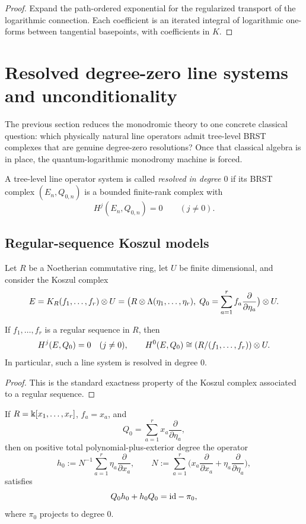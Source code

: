\begin{proof}
Expand the path-ordered exponential for the regularized transport of the logarithmic connection. Each coefficient is an iterated integral of logarithmic one-forms between tangential basepoints, with coefficients in $K$.
\end{proof}

\section{Resolved degree-zero line systems and unconditionality}\label{sec:resolved}

The previous section reduces the monodromic theory to one concrete classical question: which physically natural line operators admit tree-level BRST complexes that are genuine degree-zero resolutions? Once that classical algebra is in place, the quantum-logarithmic monodromy machine is forced.

\begin{definition}\label{def:resolved-line}
A tree-level line operator system is called \emph{resolved in degree $0$} if its BRST complex $(E_n,Q_{0,n})$ is a bounded finite-rank complex with
\[
 H^j(E_n,Q_{0,n})=0 \qquad (j\neq 0).
\]
\end{definition}

\subsection{Regular-sequence Koszul models}
Let $R$ be a Noetherian commutative ring, let $U$ be finite dimensional, and consider the Koszul complex
\[
 E = K_R(f_1,\dots,f_r)\otimes U
 = \big(R\otimes \Lambda(\eta_1,\dots,\eta_r),\;Q_0=\sum_{a=1}^r f_a\frac{\partial}{\partial\eta_a}\big)\otimes U.
\]

\begin{proposition}\label{prop:regular-sequence}
If $f_1,\dots,f_r$ is a regular sequence in $R$, then
\[
 H^j(E,Q_0)=0\quad (j\neq 0),
 \qquad
 H^0(E,Q_0)\cong (R/(f_1,\dots,f_r))\otimes U.
\]
In particular, such a line system is resolved in degree $0$.
\end{proposition}

\begin{proof}
This is the standard exactness property of the Koszul complex associated to a regular sequence.
\end{proof}

\begin{lemma}\label{lem:linear-homotopy}
If $R=\Bbbk[x_1,\dots,x_r]$, $f_a=x_a$, and
\[
 Q_0=\sum_{a=1}^r x_a\frac{\partial}{\partial\eta_a},
\]
then on positive total polynomial-plus-exterior degree the operator
\[
 h_0 := N^{-1}\sum_{a=1}^r \eta_a\frac{\partial}{\partial x_a},
 \qquad
 N:=\sum_{a=1}^r\Big(x_a\frac{\partial}{\partial x_a}+\eta_a\frac{\partial}{\partial\eta_a}\Big),
\]
satisfies
\[
 Q_0h_0+h_0Q_0=\mathrm{id}-\pi_0,
\]
where $\pi_0$ projects to degree $0$.
\end{lemma}

